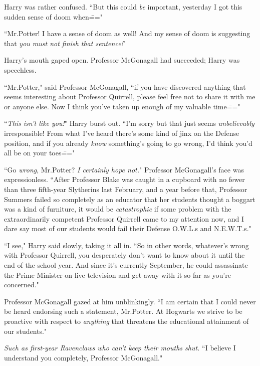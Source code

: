 Harry was rather confused. ``But this could \emph{be} important, yesterday I got this sudden sense of doom when\==="

``Mr.\?Potter! I have a sense of doom as well! And my sense of doom is suggesting that \emph{you must not finish that sentence!}"

Harry's mouth gaped open. Professor McGonagall had succeeded; Harry was speechless.

``Mr.\?Potter," said Professor McGonagall, ``if you have discovered anything that seems interesting about Professor Quirrell, please feel free not to share it with me or anyone else. Now I think you've taken up enough of my valuable time\==="

``\emph{This isn't like you!}" Harry burst out. ``I'm sorry but that just seems \emph{unbelievably} irresponsible! From what I've heard there's some kind of jinx on the Defense position, and if you already \emph{know} something's going to go wrong, I'd think you'd all be on your toes\==="

``Go \emph{wrong}, Mr.\?Potter? \emph{I certainly hope not.}" Professor McGonagall's face was expressionless. ``After Professor Blake was caught in a cupboard with no fewer than three fifth-year Slytherins last February, and a year before that, Professor Summers failed so completely as an educator that her students thought a boggart was a kind of furniture, it would be \emph{catastrophic} if some problem with the extraordinarily competent Professor Quirrell came to my attention now, and I dare say most of our students would fail their Defense O.W.L.s and N.E.W.T.s."

``I see," Harry said slowly, taking it all in. ``So in other words, whatever's wrong with Professor Quirrell, you desperately don't want to know about it until the end of the school year. And since it's currently September, he could assassinate the Prime Minister on live television and get away with it so far as you're concerned."

Professor McGonagall gazed at him unblinkingly. ``I am certain that I could never be heard endorsing such a statement, Mr.\?Potter. At Hogwarts we strive to be proactive with respect to \emph{anything} that threatens the educational attainment of our students."

\emph{Such as first-year Ravenclaws who can't keep their mouths shut.} ``I believe I understand you completely, Professor McGonagall."


